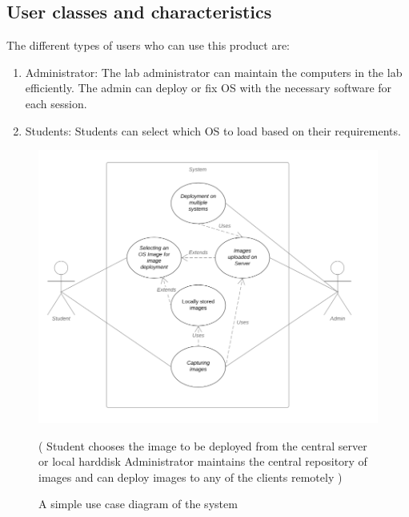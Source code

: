 \documentclass[a4paper,12pt]{article}
\begin{document}
\subsection{User classes and characteristics}
The different types of users who can use this product are:
\begin{enumerate}
    \item Administrator: The lab administrator can maintain the computers in the lab efficiently. The admin can deploy or fix OS with the necessary software for each session.
    \item Students: Students can select which OS to load based on their requirements. 
    
\end{enumerate}
\begin{figure}[h!]
    \centering
    \includegraphics[width=\linewidth]{i1.png}
    \caption{ A simple use case diagram of the system}
    \label{fig:Use case}
    \small
    ( Student chooses the image to be deployed from the central server or local harddisk
    Administrator maintains the central repository of images and can deploy
    images to any of the clients remotely )
\end{figure}
\end{document}
